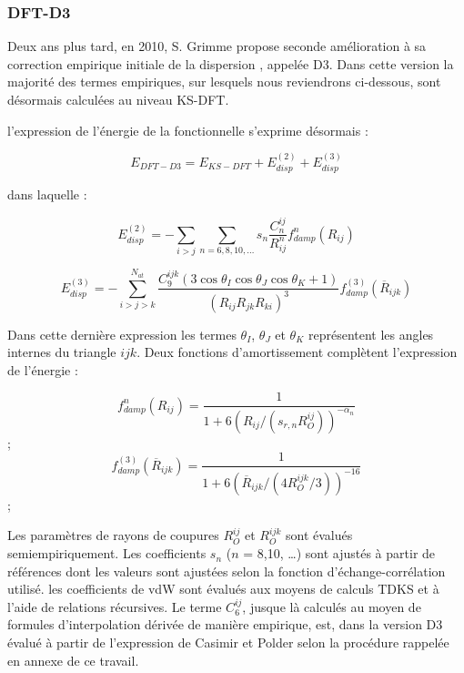 \subsubsection{DFT-D3}

Deux ans plus tard, en 2010, S. Grimme \cite{grimme2006semiempirical} propose seconde amélioration à sa correction empirique initiale de la dispersion \cite{grimme2004accurate}, appelée D3. Dans cette version la majorité des termes empiriques, sur lesquels nous reviendrons ci-dessous, sont désormais calculées au niveau KS-DFT.

l’expression de l'énergie de la fonctionnelle s’exprime désormais :

\begin{equation}
E_{DFT-D3} = E_{KS-DFT} + E_{disp}^{(2)} + E_{disp}^{(3)}
\end{equation}

dans laquelle : 

\begin{equation}
E_{disp}^{(2)}=- \sum_{i>j} \sum_{n=6,8,10,…} s_{n} \frac{C_{n}^{ij}}{R_{ij}^{n}} f_{damp}^{n} (R_{ij})
\end{equation}

\begin{equation}
E_{disp}^{(3)}= -\sum_{i>j>k}^{N_{at}} \frac{C_{9}^{ijk}(3\cos\theta_{I}\cos\theta_{J}\cos\theta_{K}+ 1)}{(R_{ij} R_{jk} R_{ki})^{3}} f_{damp}^{(3)} (\overline{R}_{ijk})
\end{equation}

Dans cette dernière expression les termes $\theta_{I}$, $\theta_{J}$ et $\theta_{K}$ représentent les angles internes du triangle $ijk$. Deux fonctions d'amortissement complètent l’expression de l’énergie :

\begin{multicols}{2}
	\begin{equation} f_{damp}^{n} (R_{ij}) =\frac{1}{1+6(R_{ij} / (s_{r,n} R_{O}^{ij}))^{-\alpha_{n}}} \end{equation}   ;  
	\begin{equation} f_{damp}^{(3)} (\overline{R}_{ijk}) =\frac{1}{1+6(\overline{R}_{ijk} / (4 R_{O}^{ijk}/3))^{-16}}\end{equation}; 
\end{multicols}

Les paramètres de rayons de coupures $R_{O}^{ij}$ et $R_{O}^{ijk}$ sont évalués semiempiriquement. Les coefficients $s_{n}$ ($n$ = 8,10, \dots) sont ajustés à partir de références dont les valeurs sont ajustées selon la fonction d’échange-corrélation utilisé. les coefficients de vdW sont évalués aux moyens de calculs TDKS et à l’aide de relations récursives. Le terme $C_{6}^{ij}$, jusque là calculés au moyen de formules d’interpolation dérivée de manière empirique, est, dans la version D3 évalué à partir de l’expression de Casimir et Polder selon la procédure rappelée en annexe de ce travail.

